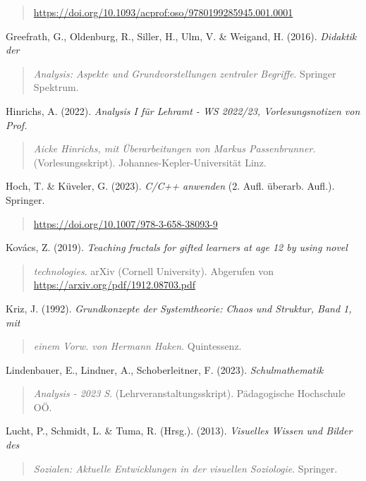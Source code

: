 \documentclass[a4paper, 12pt]{book}
\begin{document}
\begin{quote}
\url{https://doi.org/10.1093/acprof:oso/9780199285945.001.0001}
\end{quote}

Greefrath, G., Oldenburg, R., Siller, H., Ulm, V. \& Weigand, H. (2016).
\emph{Didaktik der}

\begin{quote}
\emph{Analysis: Aspekte und Grundvorstellungen zentraler Begriffe}.
Springer Spektrum.
\end{quote}

Hinrichs, A. (2022). \emph{Analysis I für Lehramt - WS 2022/23,
Vorlesungsnotizen von Prof.}

\begin{quote}
\emph{Aicke Hinrichs, mit Überarbeitungen von Markus Passenbrunner.}
(Vorlesungsskript). Johannes-Kepler-Universität Linz.
\end{quote}

Hoch, T. \& Küveler, G. (2023). \emph{C/C++ anwenden} (2. Aufl. überarb.
Aufl.). Springer.

\begin{quote}
\url{https://doi.org/10.1007/978-3-658-38093-9}
\end{quote}

Kovács, Z. (2019). \emph{Teaching fractals for gifted learners at age 12
by using novel}

\begin{quote}
\emph{technologies}. arXiv (Cornell University). Abgerufen von
\url{https://arxiv.org/pdf/1912.08703.pdf}
\end{quote}

Kriz, J. (1992). \emph{Grundkonzepte der Systemtheorie: Chaos und
Struktur, Band 1, mit}

\begin{quote}
\emph{einem Vorw. von Hermann Haken}. Quintessenz.
\end{quote}

Lindenbauer, E., Lindner, A., Schoberleitner, F. (2023).
\emph{Schulmathematik}

\begin{quote}
\emph{Analysis - 2023 S}. (Lehrveranstaltungsskript). Pädagogische
Hochschule OÖ.
\end{quote}

Lucht, P., Schmidt, L. \& Tuma, R. (Hrsg.). (2013). \emph{Visuelles
Wissen und Bilder des}

\begin{quote}
\emph{Sozialen: Aktuelle Entwicklungen in der visuellen Soziologie}.
Springer.
\end{quote}
\end{document}
